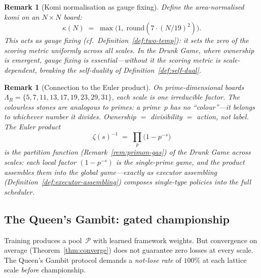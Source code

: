 \documentclass[11pt,a4paper]{article}
\newtheorem{definition}[theorem]{Definition}
\newtheorem{remark}[theorem]{Remark}
\newcommand{\cP}{\mathcal{P}}
\begin{document}
\begin{remark}[Komi normalisation as gauge fixing]%
\label{rem:komi-gauge}
Define the area-normalised komi on an $N \times N$ board:
\[
  \kappa(N)
    \;=\; \max\!\bigl(1,\;
      \mathrm{round}(7 \cdot (N/19)^2)\bigr).
\]
This acts as gauge fixing
(cf.\ Definition~\ref{def:two-temp}):
it sets the zero of the scoring metric uniformly across
all scales.
In the Drunk Game, where ownership is emergent, gauge
fixing is essential---without it the scoring metric is
scale-dependent, breaking the self-duality of
Definition~\ref{def:self-dual}.
\end{remark}

\begin{remark}[Connection to the Euler product]%
\label{rem:euler-drunk}
On prime-dimensional boards
$\Lambda_R = \{5, 7, 11, 13, 17, 19, 23, 29, 31\}$,
each scale is one irreducible factor.
The colourless stones are analogous to primes:
a prime~$p$ has no ``colour''---it belongs to whichever
number it divides.
Ownership $=$ divisibility $=$ action, not label.
The Euler product
\[
  \zeta(s)^{-1}
    \;=\; \prod_{p}\bigl(1 - p^{-s}\bigr)
\]
is the partition function
(Remark~\ref{rem:primon-gas})
of the Drunk Game across scales: each local factor $(1 - p^{-s})$ is the
single-prime game, and the product assembles them
into the global game---exactly as executor assembling
(Definition~\ref{def:executor-assembling}) composes
single-type policies into the full scheduler.
\end{remark}

\subsection{The Queen's Gambit: gated championship}\label{sec:queens-gambit}

Training produces a pool~$\cP$ with learned framework weights.
But convergence on average (Theorem~\ref{thm:converge}) does
not guarantee zero losses at every scale.
The Queen's Gambit protocol demands a \emph{not-lose rate}
of $100\%$ at each lattice scale \emph{before} championship.

\medskip
\noindent
{}
\end{document}
